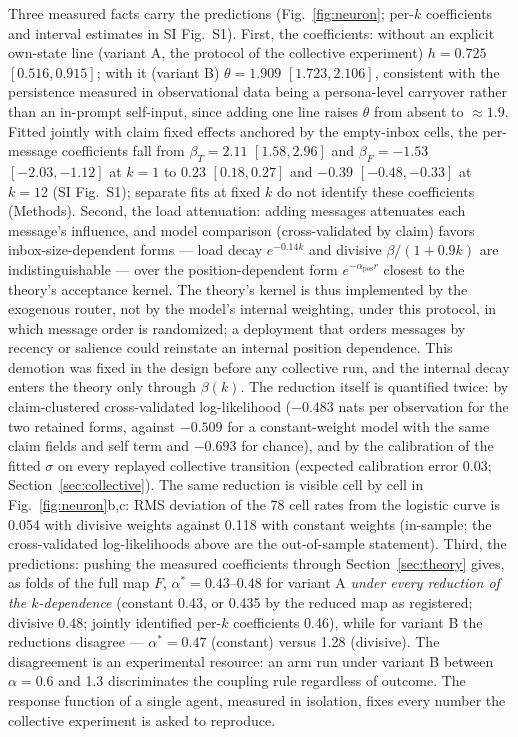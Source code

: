 \documentclass[9pt,twocolumn]{extarticle}
\newcommand{\astar}{\alpha^{*}}
\begin{document}
Three measured facts carry the predictions (Fig.~\ref{fig:neuron}; per-$k$ coefficients and interval estimates in SI Fig.~S1). First,
the coefficients: without an explicit own-state line (variant A, the protocol
of the collective experiment) $h = 0.725$ $[0.516, 0.915]$; with it (variant
B) $\theta = 1.909$ $[1.723, 2.106]$, consistent with the persistence
measured in observational data being a persona-level carryover rather than an
in-prompt self-input, since adding one line raises $\theta$ from absent to
$\approx 1.9$. Fitted jointly with claim fixed effects anchored by the
empty-inbox cells, the per-message coefficients fall from
$\beta_T = 2.11$ $[1.58, 2.96]$ and $\beta_F = -1.53$ $[-2.03, -1.12]$ at
$k = 1$ to $0.23$ $[0.18, 0.27]$ and $-0.39$ $[-0.48, -0.33]$ at $k = 12$
(SI Fig.~S1); separate fits at fixed $k$ do not identify these coefficients
(Methods). Second, the load attenuation: adding messages attenuates each
message's influence, and model comparison (cross-validated by claim) favors
inbox-size-dependent forms --- load decay $e^{-0.14k}$ and divisive
$\beta/(1+0.9k)$ are indistinguishable --- over the position-dependent form
$e^{-\alpha_{\mathrm{pos}} r}$ closest to the theory's acceptance kernel. The
theory's kernel is thus implemented by the exogenous router, not by the
model's internal weighting, under this protocol, in which message order is
randomized; a deployment that orders messages by recency or salience could
reinstate an internal position dependence. This demotion was fixed in the design before any collective run, and the internal decay enters the theory only through $\beta(k)$. The reduction itself is quantified twice: by claim-clustered cross-validated log-likelihood ($-0.483$ nats per observation for the two retained forms, against $-0.509$ for a constant-weight model with the same claim fields and self term and $-0.693$ for chance), and by the calibration of the fitted $\sigma$ on every replayed collective transition (expected calibration error 0.03; Section~\ref{sec:collective}). The same reduction is visible cell by cell in Fig.~\ref{fig:neuron}b,c: RMS deviation of the 78 cell rates from the logistic curve is 0.054 with divisive weights against 0.118 with constant weights (in-sample; the cross-validated log-likelihoods above are the out-of-sample statement). Third, the
predictions: pushing the measured coefficients through
Section~\ref{sec:theory} gives, as folds of the full map $F$,
$\astar = 0.43$--$0.48$ for variant A \emph{under every reduction of the
$k$-dependence} (constant 0.43, or 0.435 by the reduced map as registered;
divisive 0.48; jointly identified per-$k$ coefficients 0.46), while for
variant B the reductions disagree ---
$\astar = 0.47$ (constant) versus 1.28 (divisive). The disagreement is
an experimental resource: an arm run under variant B between $\alpha = 0.6$
and 1.3 discriminates the coupling rule regardless of outcome. The response
function of a single agent, measured in isolation, fixes every number the
collective experiment is asked to reproduce.
\end{document}
